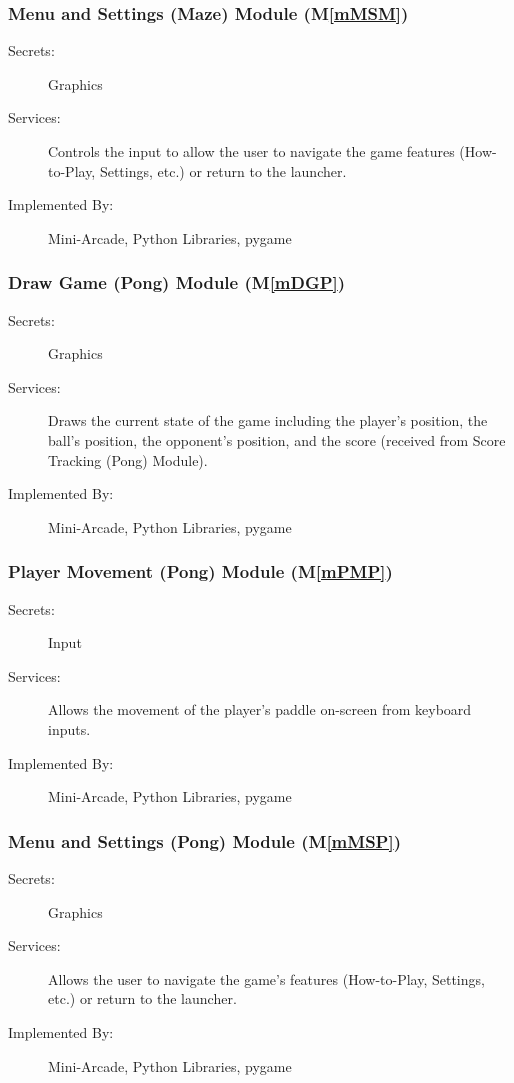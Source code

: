 \documentclass[12pt, titlepage]{article}
\newcommand{\mref}[1]{M\ref{#1}}
\begin{document}
\subsubsection{Menu and Settings (Maze) Module (\mref{mMSM})}
\begin{description}
\item[Secrets:] Graphics
\item[Services:] Controls the input to allow the user to navigate the game features (How-to-Play, Settings, etc.) or return to the launcher.
\item[Implemented By:] Mini-Arcade, Python Libraries, pygame
\end{description}

\subsubsection{Draw Game (Pong) Module (\mref{mDGP})}
\begin{description}
\item[Secrets:] Graphics
\item[Services:] Draws the current state of the game including the player's position, the ball's position, the opponent's position, and the score (received from Score Tracking (Pong) Module).
\item[Implemented By:] Mini-Arcade, Python Libraries, pygame
\end{description}

\subsubsection{Player Movement (Pong) Module (\mref{mPMP})}
\begin{description}
\item[Secrets:] Input
\item[Services:] Allows the movement of the player's paddle on-screen from keyboard inputs.
\item[Implemented By:] Mini-Arcade, Python Libraries, pygame
\end{description}

\subsubsection{Menu and Settings (Pong) Module (\mref{mMSP})}
\begin{description}
\item[Secrets:] Graphics
\item[Services:] Allows the user to navigate the game's features (How-to-Play, Settings, etc.) or return to the launcher.
\item[Implemented By:] Mini-Arcade, Python Libraries, pygame
\end{description}
\end{document}
